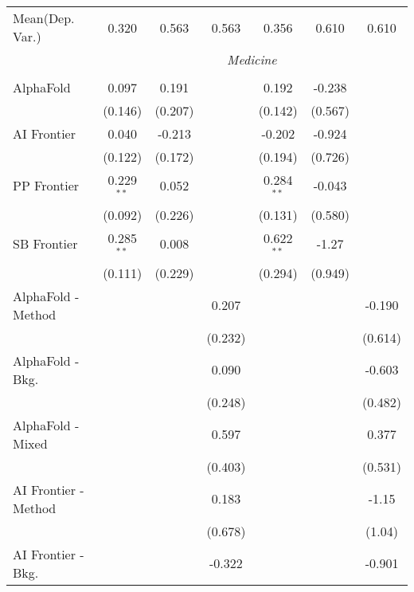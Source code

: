 \begin{tabular}{lcccccc}
Mean(Dep. Var.) & 0.320 & 0.563 & 0.563 & 0.356 & 0.610 & 0.610 \\
 & \multicolumn{6}{c}{\textit{Medicine}} \\ \\
   AlphaFold            & 0.097        & 0.191   &              & 0.192        & -0.238  &   \\   
                        & (0.146)      & (0.207) &              & (0.142)      & (0.567) &   \\   
   AI Frontier          & 0.040        & -0.213  &              & -0.202       & -0.924  &   \\   
                        & (0.122)      & (0.172) &              & (0.194)      & (0.726) &   \\   
   PP Frontier          & 0.229$^{**}$ & 0.052   &              & 0.284$^{**}$ & -0.043  &   \\   
                        & (0.092)      & (0.226) &              & (0.131)      & (0.580) &   \\   
   SB Frontier          & 0.285$^{**}$ & 0.008   &              & 0.622$^{**}$ & -1.27   &   \\   
                        & (0.111)      & (0.229) &              & (0.294)      & (0.949) &   \\   
   AlphaFold - Method   &              &         & 0.207        &              &         & -0.190\\   
                        &              &         & (0.232)      &              &         & (0.614)\\   
   AlphaFold - Bkg.     &              &         & 0.090        &              &         & -0.603\\   
                        &              &         & (0.248)      &              &         & (0.482)\\   
   AlphaFold - Mixed    &              &         & 0.597        &              &         & 0.377\\   
                        &              &         & (0.403)      &              &         & (0.531)\\   
   AI Frontier - Method &              &         & 0.183        &              &         & -1.15\\   
                        &              &         & (0.678)      &              &         & (1.04)\\   
   AI Frontier - Bkg.   &              &         & -0.322       &              &         & -0.901\\   

\end{tabular}
